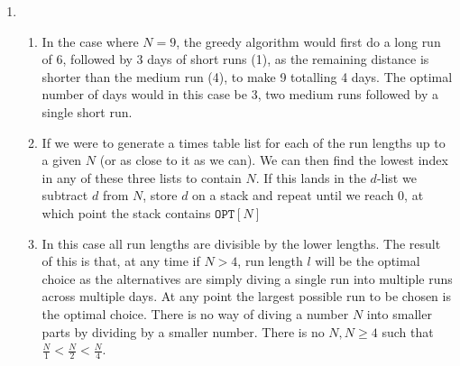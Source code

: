 \documentclass{article}
\begin{document}
\begin{enumerate}
\begin{enumerate}
        \end{enumerate}
  \item
        \begin{enumerate}
\item In the case where $N=9$, the greedy algorithm would first do a long run of 6, followed by 3 days of short runs (1), as the remaining distance is shorter than the medium run (4), to make 9 totalling 4 days. The optimal number of days would in this case be 3, two medium runs followed by a single short run.
          \item
                If we were to generate a times table list for each of the run lengths up to a given $N$ (or as close to it as we can). We can then find the lowest index in any of these three lists to contain $N$. If this lands in the $d$-list we subtract $d$ from $N$, store $d$ on a stack and repeat until we reach 0, at which point the stack contains $\texttt{OPT}[N] $
          \item In this case all run lengths are divisible by the lower lengths. The result of this is that, at any time if $N > 4$, run length $l$ will be the optimal choice as the alternatives are simply diving a single run into multiple runs across multiple days. At any point the largest possible run to be chosen is the optimal choice. There is no way of diving a number $N$ into smaller parts by dividing by a smaller number. There is no $N, N\geq 4$ such that $\frac{N}{1} < \frac{N}{2} < \frac{N}{4}$.
        \end{enumerate}




\end{enumerate}
\end{document}
